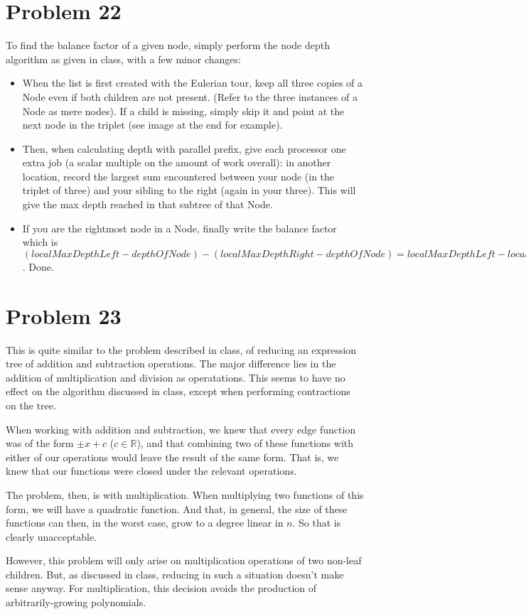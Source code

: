 \documentclass{article}
\providecommand{\prob}[1]{\section*{Problem #1}}
\providecommand{\R}{\mathbb{R}}
\begin{document}
\prob{22}
To find the balance factor of a given node, simply perform the node depth algorithm as given in class, with a few minor changes:
\begin{itemize}
  \item When the list is first created with the Eulerian tour, keep all three copies of a Node even if both children are not present. (Refer to the three instances of a Node as mere nodes). If a child is missing, simply skip it and point at the next node in the triplet (see image at the end for example).
  \item Then, when calculating depth with parallel prefix, give each processor one extra job (a scalar multiple on the amount of work overall): in another location, record the largest sum encountered between your node (in the triplet of three) and your sibling to the right (again in your three). This will give the max depth reached in that subtree of that Node.
  \item If you are the rightmost node in a Node, finally write the balance factor which is $(localMaxDepthLeft - depthOfNode) - (localMaxDepthRight - depthOfNode) = localMaxDepthLeft - localMaxDepthRight$. Done.
\end{itemize}



\prob{23}
This is quite similar to the problem described in class, of reducing an expression tree of addition and subtraction operations.
The major difference lies in the addition of multiplication and division as operatations.
This seems to have no effect on the algorithm discussed in class, except when performing contractions on the tree.

When working with addition and subtraction, we knew that every edge function was of the form $\pm x + c$ ($c \in \R$), and that combining two of these functions with either of our operations would leave the result of the same form.
That is, we knew that our functions were closed under the relevant operations.

The problem, then, is with multiplication.
When multiplying two functions of this form, we will have a quadratic function.
And that, in general, the size of these functions can then, in the worst case, grow to a degree linear in $n$.
So that is clearly unacceptable.

However, this problem will only arise on multiplication operations of two non-leaf children.
But, as discussed in class, reducing in such a situation doesn't make sense anyway.
For multiplication, this decision avoids the production of arbitrarily-growing polynomials.
\end{document}
